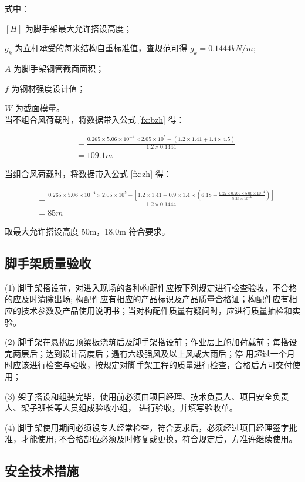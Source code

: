 式中：

$[H]$ 为脚手架最大允许搭设高度；

$g_k$ 为立杆承受的每米结构自重标准值，查规范可得 $g_k=0.1444kN/m$;

$A$ 为脚手架钢管截面面积； 

$f$ 为钢材强度设计值； 

$W$ 为截面模量。\\

当不组合风荷载时，将数据带入公式 \ref{fx:bzh} 得：

\begin{align*}
    [H] &=\frac{0.265\times 5.06\times10^{-4}\times 2.05\times 10^5-(1.2\times 1.41+1.4\times 4.5)}{1.2\times 0.1444}\\
    &=109.1m
\end{align*}

当组合风荷载时，将数据带入公式 \ref{fx:zh} 得：

\begin{align*}
[H] &=\frac{0.265\times 5.06\times10^{-4}\times 2.05\times10^5-[1.2\times 1.41+0.9\times 1.4\times(6.18+\frac{0.22\times 0.265\times 5.06\times 10^{-4}}{5.26\times 10^{-6}})]}{1.2\times 0.1444}\\
&=85m
\end{align*}

取最大允许搭设高度 50m，18.0m 符合要求。

\subsection{脚手架质量验收}

(1) 脚手架搭设前，对进入现场的各种构配件应按下列规定进行检查验收，不合格的应及时清除出场;
构配件应有相应的产品标识及产品质量合格证；构配件应有相应的技术参数及产品使用说明书；当对构配件质量有疑问时，应进行质量抽检和实
验。

(2) 脚手架在悬挑层顶梁板浇筑后及脚手架搭设前；作业层上施加荷载前；每搭设完两层后；达到设计高度后；遇有六级强风及以上风或大雨后；停
用超过一个月时应该进行检查与验收，按规定对脚手架工程的质量进行检查，合格后方可交付使用；

(3) 架子搭设和组装完毕，使用前必须由项目经理、技术负责人、项目安全负责人、架子班长等人员组成验收小组，
进行验收，并填写验收单。

(4) 脚手架使用期间必须设专人经常检查，符合要求后，必须经过项目经理签字批准，才能使用;
不合格部位必须及时修复或更换，符合规定后，方准许继续使用。 

\subsection{安全技术措施}
